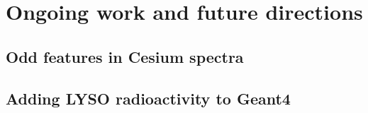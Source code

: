 \chapter{Ongoing work and future directions}

\section{Odd features in Cesium spectra}

\section{Adding LYSO radioactivity to Geant4}
